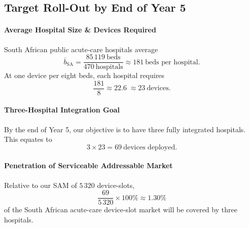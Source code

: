 \documentclass[a4paper,11pt]{article}
\begin{document}
\subsection{Target Roll-Out by End of Year 5}

\paragraph{Average Hospital Size \& Devices Required}%
South African public acute-care hospitals average
\[
  \bar b_{\mathrm{SA}}
  = \frac{85\,119\ \text{beds}}{470\ \text{hospitals}}
  \approx181\ \text{beds per hospital}.
\]
At one device per eight beds, each hospital requires
\[
  \frac{181}{8}
  \approx22.6
  \;\approx23\ \text{devices}.
\]

\paragraph{Three-Hospital Integration Goal}%
By the end of Year 5, our objective is to have three fully integrated hospitals.  This equates to
\[
  3 \times 23 = 69\ \text{devices deployed}.
\]

\paragraph{Penetration of Serviceable Addressable Market}%
Relative to our SAM of \(5\,320\) device-slots,
\[
  \frac{69}{5\,320}\times100\%
  \approx1.30\%
\]
of the South African acute-care device-slot market will be covered by three hospitals.  
\end{document}
